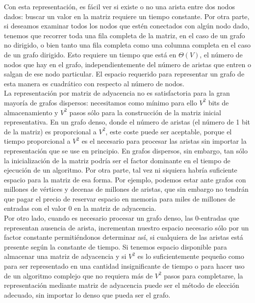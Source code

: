 Con esta representación, es fácil ver si existe o no una arista entre dos nodos dados: buscar un valor en la matriz requiere un tiempo constante. Por otra parte, si deseamos examinar todos los nodos que estén conectados con algún nodo dado, tenemos que recorrer toda una fila completa de la matriz, en el caso de un grafo no dirigido, o bien tanto una fila completa como una columna completa en el caso de un grafo dirigido. Esto requiere un tiempo que está en $\Theta(V)$, el número de nodos que hay en el grafo, independientemente del número de aristas que entren o salgan de ese nodo particular. El espacio requerido para representar un grafo de esta manera es cuadrático con respecto al número de nodos.\\

La representación por matriz de adyacencia no es satisfactoria para la gran mayoría de grafos dispersos: necesitamos como mínimo para ello $V^2$ bits de almacenamiento y $V^2$ pasos sólo para la construcción de la matriz inicial representativa. En un grafo denso, donde el número de aristas (el número de 1 bit de la matriz) es proporcional a $V^2$, este coste puede ser aceptable, porque el tiempo proporcional a $V^2$ es el necesario para procesar las aristas sin importar la representación que se use en principio. En grafos dispersos, sin embargo, tan sólo la inicialización de la matriz podría ser el factor dominante en el tiempo de ejecución de un algoritmo. Por otra parte, tal vez ni siquiera habría suficiente espacio para la matriz de esa forma. Por ejemplo, podemos estar ante grafos con millones de vértices y decenas de millones de aristas, que sin embargo no tendrán que pagar el precio de reservar espacio en memoria para miles de millones de entradas con el valor 0 en la matriz de adyacencia.\\

Por otro lado, cuando es necesario procesar un grafo denso, las 0-entradas que representan ausencia de arista, incrementan nuestro espacio necesario sólo por un factor constante permitiéndonos determinar así, si cualquiera de las aristas está presente según la constante de tiempo. Si tenemos espacio disponible para almacenar una matriz de adyacencia y si $V^2$ es lo suficientemente pequeño como para ser representado en una cantidad insignificante de tiempo o para hacer uso de un algoritmo complejo que no requiera más de $V^2$ pasos para completarse, la representación mediante matriz de adyacencia puede ser el método de elección adecuado, sin importar lo denso que pueda ser el grafo.\\

